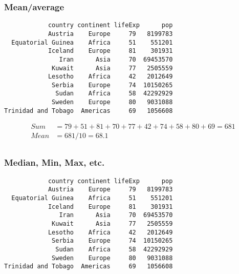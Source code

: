 \documentclass[17pt]{beamer} %
\begin{document}


\begin{frame}[fragile]
\frametitle{{\normalsize Mean/average}}
\footnotesize
\begin{verbatim}
            country continent lifeExp      pop
            Austria    Europe     79   8199783
  Equatorial Guinea    Africa     51    551201
            Iceland    Europe     81    301931
               Iran      Asia     70  69453570
             Kuwait      Asia     77   2505559
            Lesotho    Africa     42   2012649
             Serbia    Europe     74  10150265
              Sudan    Africa     58  42292929
             Sweden    Europe     80   9031088
Trinidad and Tobago  Americas     69   1056608
\end{verbatim}

\vspace{-1.5em}
\begin{align*}
Sum &= 79 + 51 + 81 + 70 + 77 + 42 + 74 + 58 + 80 + 69 = 681\\
Mean &= 681/10 = 68.1\\
\end{align*}

\end{frame}



\begin{frame}[fragile]
\frametitle{\normalsize{Median, Min, Max, etc.}}
\footnotesize
\begin{verbatim}
            country continent lifeExp      pop
            Austria    Europe     79   8199783
  Equatorial Guinea    Africa     51    551201
            Iceland    Europe     81    301931
               Iran      Asia     70  69453570
             Kuwait      Asia     77   2505559
            Lesotho    Africa     42   2012649
             Serbia    Europe     74  10150265
              Sudan    Africa     58  42292929
             Sweden    Europe     80   9031088
Trinidad and Tobago  Americas     69   1056608
\end{verbatim}
\end{frame}
\end{document}
